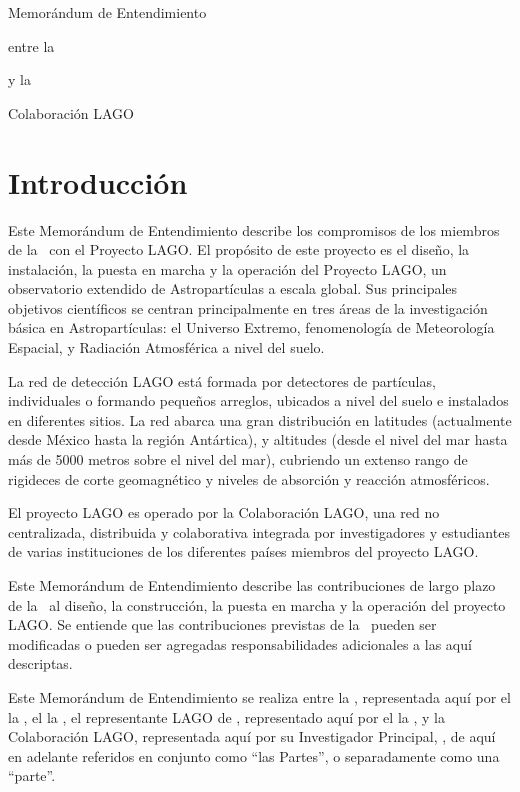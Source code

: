 {\bf
  {\LARGE
    \centerline{Memorándum de Entendimiento}
  }
  {\Large
    \centerline{entre la}
    \centerline{\institution}
    \centerline{y la}
    \centerline{Colaboración LAGO}
    \vspace*{0.2cm}
    \centerline{\datesignes}
  }
}

\section{Introducción}

Este Memorándum de Entendimiento describe los compromisos de los miembros de
la \institution~con el Proyecto LAGO. El propósito de este proyecto es el
diseño, la instalación, la puesta en marcha y la operación del Proyecto LAGO,
un observatorio extendido de Astropartículas a escala global. Sus principales
objetivos científicos se centran principalmente en tres áreas de la
investigación básica en Astropartículas: el Universo Extremo, fenomenología de
Meteorología Espacial, y Radiación Atmosférica a nivel del suelo. 

La red de detección LAGO está formada por detectores de partículas,
individuales o formando pequeños arreglos, ubicados a nivel del suelo e
instalados en diferentes sitios. La red abarca una gran distribución en latitudes
(actualmente desde México hasta la región Antártica), y altitudes (desde el
nivel del mar hasta más de 5000 metros sobre el nivel del mar), cubriendo un
extenso rango de rigideces de corte geomagnético y niveles de absorción y
reacción atmosféricos.

El proyecto LAGO es operado por la Colaboración LAGO, una red no centralizada,
distribuida y colaborativa integrada por investigadores y estudiantes de varias
instituciones de los diferentes países miembros del proyecto LAGO.

Este Memorándum de Entendimiento describe las contribuciones de largo plazo de
la \institution~al diseño, la construcción, la puesta en marcha y la operación
del proyecto LAGO. Se entiende que las contribuciones previstas de la
\institution~pueden ser modificadas o pueden ser agregadas responsabilidades
adicionales a las aquí descriptas.

Este Memorándum de Entendimiento se realiza entre la \institution, representada
aquí por 
\ifil
\ifilg el \else la \fi \instlegalrep, 
\else
\ifirg el \else la \fi \instrep,
\fi
el representante LAGO de \country,
representado aquí por \ifcrg el \else la \fi \countryrep, y la Colaboración
LAGO, representada aquí por su Investigador Principal, \lagopi, de aquí en
adelante referidos en conjunto como ``las Partes'', o separadamente como una
``parte''.

